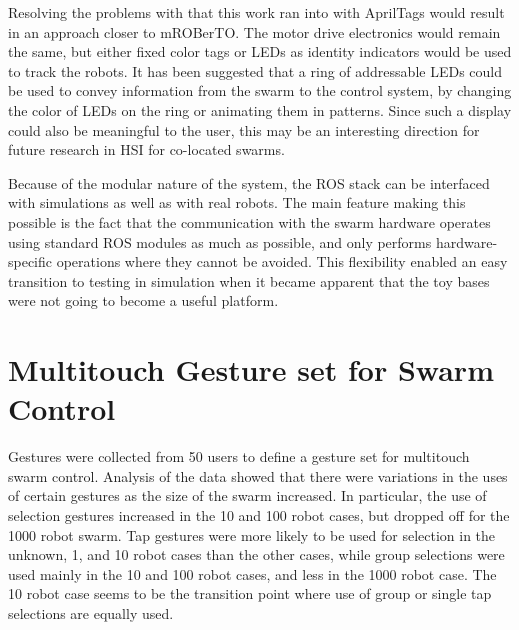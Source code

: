 Resolving the problems with that this work ran into with AprilTags would result in an approach closer to mROBerTO.
The motor drive electronics would remain the same, but either fixed color tags or LEDs as identity indicators would be used to track the robots. 
It has been suggested that a ring of addressable LEDs could be used to convey information from the swarm to the control system, by changing the color of LEDs on the ring or animating them in patterns. 
Since such a display could also be meaningful to the user, this may be an interesting direction for future research in HSI for co-located swarms.  

Because of the modular nature of the system, the ROS stack can be interfaced with simulations as well as with real robots. 
The main feature making this possible is the fact that the communication with the swarm hardware operates using standard ROS modules as much as possible, and only performs hardware-specific operations where they cannot be avoided. 
This flexibility enabled an easy transition to testing in simulation when it became apparent that the toy bases were not going to become a useful platform. 

\section{Multitouch Gesture set for Swarm Control} \label{section:Multitouch_Gesture_set_for_Swarm_Control}

Gestures were collected from 50 users to define a gesture set for multitouch swarm control. 
Analysis of the data showed that there were variations in the uses of certain gestures as the size of the swarm increased. 
In particular, the use of selection gestures increased in the 10 and 100 robot cases, but dropped off for the 1000 robot swarm. 
Tap gestures were more likely to be used for selection in the unknown, 1, and 10 robot cases than the other cases, while group selections were used mainly in the 10 and 100 robot cases, and less in the 1000 robot case. 
The 10 robot case seems to be the transition point where use of group or single tap selections are equally used. 

